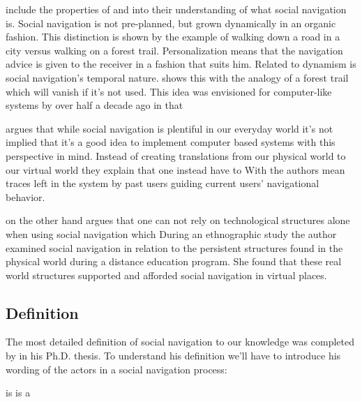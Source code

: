 \citet[p.~39]{dieberger00b} include the properties of 
and  into their understanding of what social navigation is.
Social navigation is not pre-planned, but grown dynamically in an organic
fashion. This distinction is shown by the example of walking down a road in a
city versus walking on a forest trail. Personalization means that the
navigation advice is given to the receiver in a fashion that suits him.
Related to dynamism is social navigation's temporal nature.
\citet[p.~39]{dieberger00b} shows this with the analogy of a forest trail
which will vanish if it's not used. This idea was envisioned for computer-like
systems by \citeauthor{bush45} over half a decade ago in that

\citet{svensson05} argues that while social navigation is plentiful in
our everyday world it's not implied that it's a good idea to implement
computer based systems with this perspective in mind. Instead of creating
translations from our physical world to our virtual world
they explain that one instead have to
With  the authors mean traces left in the system by past
users guiding current users' navigational behavior.

\citeauthor{robins02} on the other hand argues that one can not rely on
technological structures alone when using social navigation which
During an ethnographic study the author examined social navigation in relation
to the persistent structures found in the physical world during a distance
education program. She found that these real world structures supported and
afforded social navigation in virtual places.

\subsection{Definition}

The most detailed definition of social navigation to our knowledge was
completed by \citet{svensson03} in his Ph.D. thesis. To understand his
definition we'll have to introduce his wording of the actors in a social
navigation process:

\begin{items}
   is 
   is a 
\end{items}

